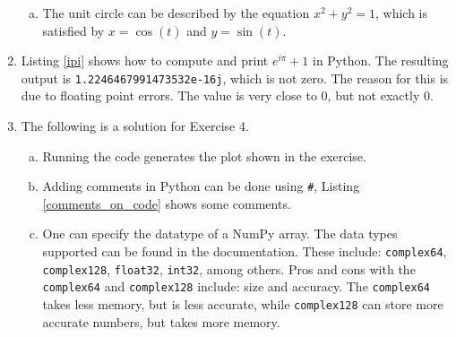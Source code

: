 \begin{enumerate}
\begin{enumerate}[a)]
          \item The unit circle can be described by the equation $x^{2} + y^{2} = 1$, which is satisfied by $x = \cos(t)$ and $y = \sin(t)$.
        \end{enumerate}

  \item Listing \ref{ipi} shows how to compute and print $e^{i\pi}+1$ in Python. The resulting output is \verb|1.2246467991473532e-16j|, which is not zero.
        The reason for this is due to floating point errors. The value is very close to 0, but not exactly 0.

        

  \item The following is a solution for Exercise 4.

        \begin{enumerate}[a)]
          \item Running the code generates the plot shown in the exercise.

          \item Adding comments in Python can be done using \verb|#|, Listing \ref{comments_on_code} shows some comments.
                

          \item One can specify the datatype of a NumPy array. The data types supported can be found in the documentation.
                These include: \verb|complex64|, \verb|complex128|, \verb|float32|, \verb|int32|, among others.
                Pros and cons with the \verb|complex64| and \verb|complex128| include: size and accuracy. The \verb|complex64|
                takes less memory, but is less accurate, while \verb|complex128| can store more accurate numbers, but takes more memory.

        \end{enumerate}

\end{enumerate}
